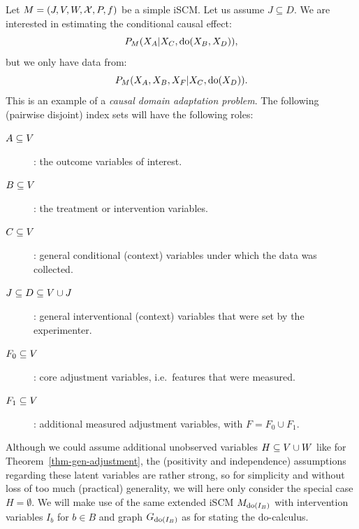 Let $M = \left ( J, V, W, \mathcal{X}, P, f \right )$ be a simple iSCM.
Let us assume $J \subseteq D$.
We are interested in estimating the conditional causal effect:
\[ P_{M}(X_A|X_C,\operatorname{do}(X_B,X_D)), \]
but we only have data from:
\[ P_{M}(X_A,X_B,X_F|X_C,\operatorname{do}(X_D)). \]
This is an example of a \emph{causal domain adaptation problem}.
The following (pairwise disjoint) index sets will have the following roles:
\begin{description}
  \item[$A \subseteq V$]: the outcome variables of interest.
  \item[$B \subseteq V$]: the treatment or intervention variables.
  \item[$C \subseteq V$]: general conditional (context) variables under which the data was collected.
  \item[$J \subseteq D \subseteq V \cup J$]: general interventional (context) variables that were set by the experimenter.
  \item[$F_0 \subseteq V$]: core adjustment variables, i.e.\ features that were measured.
  \item[$F_1 \subseteq V$]: additional measured adjustment variables, with $F = F_0 \cup F_1$.
\end{description}
Although we could assume additional unobserved variables $H \subseteq V \cup W$ like for Theorem~\ref{thm-gen-adjustment}, the (positivity and independence) assumptions regarding these latent variables are rather strong, so for simplicity and without loss of too much (practical) generality, we will here only consider the special case $H = \emptyset$.
We will make use of the same extended iSCM $M_{\operatorname{do}(I_B)}$ with intervention variables $I_b$ for $b \in B$ and graph $G_{\operatorname{do}(I_B)}$ as for stating the do-calculus.

